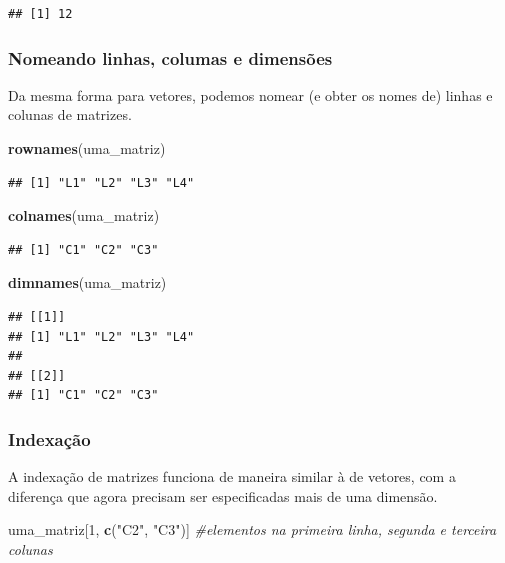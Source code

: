 \documentclass[
]{book}
\newenvironment{Shaded}{\begin{snugshade}}{\end{snugshade}}
\newcommand{\CommentTok}[1]{\textcolor[rgb]{0.56,0.35,0.01}{\textit{#1}}}
\newcommand{\DecValTok}[1]{\textcolor[rgb]{0.00,0.00,0.81}{#1}}
\newcommand{\FunctionTok}[1]{\textcolor[rgb]{0.13,0.29,0.53}{\textbf{#1}}}
\newcommand{\NormalTok}[1]{#1}
\newcommand{\StringTok}[1]{\textcolor[rgb]{0.31,0.60,0.02}{#1}}
\begin{document}
\begin{verbatim}
## [1] 12
\end{verbatim}

\subsubsection{Nomeando linhas, columas e dimensões}\label{nomeando-linhas-columas-e-dimensuxf5es}

Da mesma forma para vetores, podemos nomear (e obter os nomes de) linhas e colunas de matrizes.

\begin{Shaded}
\begin{Highlighting}[]
\FunctionTok{rownames}\NormalTok{(uma\_matriz)}
\end{Highlighting}
\end{Shaded}

\begin{verbatim}
## [1] "L1" "L2" "L3" "L4"
\end{verbatim}

\begin{Shaded}
\begin{Highlighting}[]
\FunctionTok{colnames}\NormalTok{(uma\_matriz)}
\end{Highlighting}
\end{Shaded}

\begin{verbatim}
## [1] "C1" "C2" "C3"
\end{verbatim}

\begin{Shaded}
\begin{Highlighting}[]
\FunctionTok{dimnames}\NormalTok{(uma\_matriz)}
\end{Highlighting}
\end{Shaded}

\begin{verbatim}
## [[1]]
## [1] "L1" "L2" "L3" "L4"
## 
## [[2]]
## [1] "C1" "C2" "C3"
\end{verbatim}

\subsubsection{Indexação}\label{indexauxe7uxe3o}

A indexação de matrizes funciona de maneira similar à de vetores, com a diferença que agora precisam ser especificadas mais de uma dimensão.

\begin{Shaded}
\begin{Highlighting}[]
\NormalTok{uma\_matriz[}\DecValTok{1}\NormalTok{, }\FunctionTok{c}\NormalTok{(}\StringTok{"C2"}\NormalTok{, }\StringTok{"C3"}\NormalTok{)] }\CommentTok{\#elementos na primeira linha, segunda e terceira colunas}
\end{Highlighting}
\end{Shaded}
\end{document}

